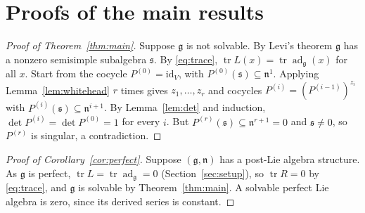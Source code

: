 \documentclass[11pt]{article}
\theoremstyle{definition}
\theoremstyle{remark}
\newcommand{\g}{\mathfrak{g}}
\newcommand{\n}{\mathfrak{n}}
\newcommand{\s}{\mathfrak{s}}
\DeclareMathOperator{\ad}{ad}
\DeclareMathOperator{\tr}{tr}
\begin{document}
\section{Proofs of the main results}

\begin{proof}[Proof of Theorem~\ref{thm:main}]
Suppose $\g$ is not solvable. By Levi's theorem $\g$ has a nonzero
semisimple subalgebra $\s$. By \eqref{eq:trace},
$\tr L(x)=\tr\ad_\g(x)$ for all $x$. Start from the cocycle
$P^{(0)}=\mathrm{id}_V$, with $P^{(0)}(\s)\subseteq\n^1$. Applying
Lemma~\ref{lem:whitehead} $r$ times gives $z_1,\dots,z_r$ and cocycles
$P^{(i)}=(P^{(i-1)})^{z_i}$ with $P^{(i)}(\s)\subseteq\n^{i+1}$. By
Lemma~\ref{lem:det} and induction, $\det P^{(i)}=\det P^{(0)}=1$ for
every $i$. But $P^{(r)}(\s)\subseteq\n^{r+1}=0$ and $\s\ne0$, so
$P^{(r)}$ is singular, a contradiction.
\end{proof}

\begin{proof}[Proof of Corollary~\ref{cor:perfect}]
Suppose $(\g,\n)$ has a post-Lie algebra structure. As $\g$ is perfect,
$\tr L=\tr\ad_\g=0$ (Section~\ref{sec:setup}), so $\tr R=0$ by
\eqref{eq:trace}, and $\g$ is solvable by Theorem~\ref{thm:main}. A
solvable perfect Lie algebra is zero, since its derived series is
constant.
\end{proof}
\end{document}
